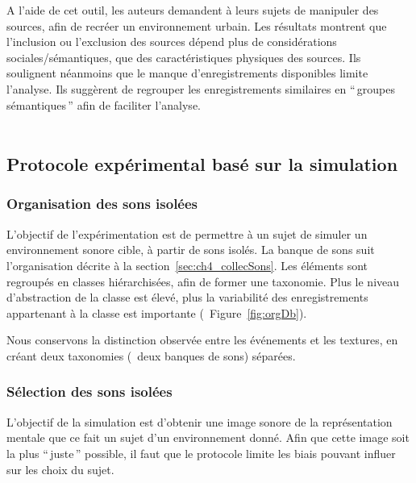 A l'aide de cet outil, les auteurs demandent à leurs sujets de manipuler des sources, afin de recréer un environnement urbain. Les résultats montrent que l'inclusion ou l'exclusion des sources dépend plus de considérations sociales/sémantiques, que des caractéristiques physiques des sources. Ils soulignent néanmoins que le manque d'enregistrements disponibles limite l'analyse. Ils suggèrent  de regrouper les enregistrements similaires en ``\,groupes sémantiques\,'' afin de faciliter l'analyse. \\

 \\

\subsection{Protocole expérimental basé sur la simulation}

\subsubsection{Organisation des sons isolées}

L'objectif de l'expérimentation est de permettre à un sujet de simuler un environnement sonore cible, à partir de sons isolés. La banque de sons suit l'organisation décrite à la section~\ref{sec:ch4_collecSons}. Les éléments sont regroupés en classes hiérarchisées, afin de former une taxonomie. Plus le niveau d'abstraction de la classe est élevé, plus la variabilité des enregistrements appartenant à la classe est importante (\cf~Figure~\ref{fig:orgDb}).
 
Nous conservons la distinction observée entre les événements et les textures, en créant deux taxonomies (\ie~deux banques de sons) séparées.

\subsubsection{Sélection des sons isolées}

L'objectif de la simulation est d'obtenir une image sonore de la représentation mentale que ce fait un sujet d'un environnement donné. Afin que cette image soit la plus ``\,juste\,'' possible, il faut que le protocole limite les biais pouvant influer sur les choix du sujet.

